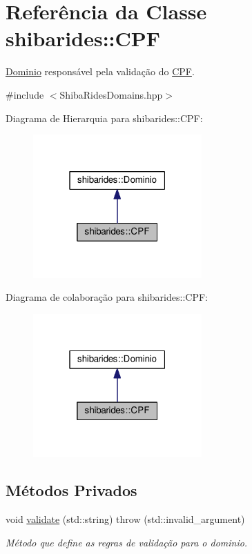\hypertarget{classshibarides_1_1CPF}{}\section{Referência da Classe shibarides\+:\+:C\+PF}
\label{classshibarides_1_1CPF}


\hyperlink{classshibarides_1_1Dominio}{Dominio} responsável pela validação do \hyperlink{classshibarides_1_1CPF}{C\+PF}.  




{\ttfamily \#include $<$Shiba\+Rides\+Domains.\+hpp$>$}



Diagrama de Hierarquia para shibarides\+:\+:C\+PF\+:\nopagebreak
\begin{figure}[H]
\begin{center}
\leavevmode
\includegraphics[width=183pt]{classshibarides_1_1CPF__inherit__graph}
\end{center}
\end{figure}


Diagrama de colaboração para shibarides\+:\+:C\+PF\+:\nopagebreak
\begin{figure}[H]
\begin{center}
\leavevmode
\includegraphics[width=183pt]{classshibarides_1_1CPF__coll__graph}
\end{center}
\end{figure}
\subsection*{Métodos Privados}
\begin{DoxyCompactItemize}
\item 
void \hyperlink{classshibarides_1_1CPF_a0764894456e73dde8130a07f95b68f08}{validate} (std\+::string)  throw (std\+::invalid\+\_\+argument)
\begin{DoxyCompactList}\small\item\em Método que define as regras de validação para o dominio. \end{DoxyCompactList}\end{DoxyCompactItemize}

